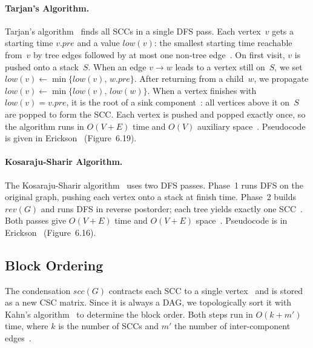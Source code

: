 \documentclass[12pt]{article}
\theoremstyle{definition}
\begin{document}
\paragraph{Tarjan's Algorithm.}
Tarjan's algorithm~\cite{TARJANalgo} finds all SCCs in a single DFS pass. Each vertex~$v$ gets a starting time $v.\mathit{pre}$ and a value $\mathit{low}(v)$: the smallest starting time reachable from~$v$ by tree edges followed by at most one non-tree edge~\cite{erickson2019algorithms}. On first visit, $v$ is pushed onto a stack~$S$. When an edge $v \!\to\! w$ leads to a vertex still on~$S$, we set $\mathit{low}(v) \leftarrow \min\{\mathit{low}(v),\, w.\mathit{pre}\}$. After returning from a child~$w$, we propagate $\mathit{low}(v) \leftarrow \min\{\mathit{low}(v),\, \mathit{low}(w)\}$. When a vertex finishes with $\mathit{low}(v) = v.\mathit{pre}$, it is the root of a sink component~\cite{erickson2019algorithms}: all vertices above it on~$S$ are popped to form the SCC. Each vertex is pushed and popped exactly once, so the algorithm runs in $O(V + E)$ time and $O(V)$ auxiliary space~\cite{erickson2019algorithms,TARJANalgo}. Pseudocode is given in Erickson~\cite{erickson2019algorithms} (Figure~6.19).

\paragraph{Kosaraju-Sharir Algorithm.}
The Kosaraju-Sharir algorithm~\cite{SHARIRalgo} uses two DFS passes. Phase~1 runs DFS on the original graph, pushing each vertex onto a stack at finish time. Phase~2 builds $\mathit{rev}(G)$ and runs DFS in reverse postorder; each tree yields exactly one SCC~\cite{erickson2019algorithms}. Both passes give $O(V + E)$ time and $O(V + E)$ space~\cite{erickson2019algorithms,SHARIRalgo}. Pseudocode is in Erickson~\cite{erickson2019algorithms} (Figure~6.16).

\subsection{Block Ordering}

The condensation $\mathit{scc}(G)$ contracts each SCC to a single vertex~\cite{erickson2019algorithms} and is stored as a new CSC matrix. Since it is always a DAG, we topologically sort it with Kahn's algorithm~\cite{kahn1962topological} to determine the block order. Both steps run in $O(k + m')$ time, where $k$ is the number of SCCs and $m'$ the number of inter-component edges~\cite{kahn1962topological}.
\end{document}
